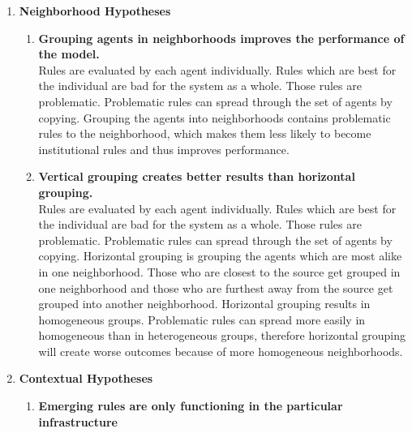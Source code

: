 \documentclass[a4paper]{article}
\begin{document}
\begin{enumerate}
\item \textbf{Neighborhood Hypotheses} \begin{enumerate}
                                        \item \textbf{Grouping agents in neighborhoods  improves the performance of the model.}\\
                                        Rules are evaluated by each agent individually. Rules which are best for 
                                        the individual are bad for the system as a whole. Those rules are problematic.
                                        Problematic rules can spread through the set of agents by copying. Grouping the
                                        agents into neighborhoods contains problematic rules to the neighborhood, which
                                        makes them less likely to become institutional rules and thus improves performance.
                                        \item \textbf{Vertical grouping creates better results than horizontal grouping.}\\
                                        Rules are evaluated by each agent individually. Rules which are best for the 
                                        individual are bad for the system as a whole. Those rules are problematic. 
                                        Problematic rules can spread through the set of agents by copying. 
                                        Horizontal grouping is grouping the agents which are most alike in one 
                                        neighborhood. Those who are closest to the source get grouped in one 
                                        neighborhood and those who are furthest away from the source get grouped 
                                        into another neighborhood. Horizontal grouping results in homogeneous groups. 
                                        Problematic rules can spread more easily in homogeneous than in heterogeneous
                                        groups, therefore horizontal grouping will create worse outcomes because of 
                                        more homogeneous neighborhoods. 
                                       \end{enumerate}
\item \textbf{Contextual Hypotheses} \begin{enumerate}
                                      \item \textbf{Emerging rules are only functioning in the particular infrastructure 
}
\end{enumerate}
\end{enumerate}
\end{document}
